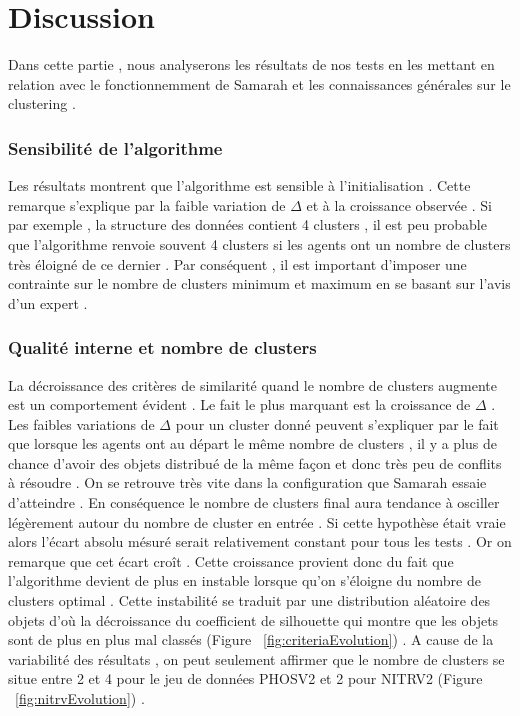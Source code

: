 \documentclass[11pt, openany]{report}
\begin{document}
\section{Discussion}
Dans cette partie ,  nous analyserons les résultats de nos tests en les mettant en relation avec le fonctionnemment de Samarah  et les connaissances générales sur le clustering .

\subsubsection{Sensibilité de l'algorithme}
\setlength{\parindent}{0in}
Les résultats montrent que l'algorithme est sensible à l'initialisation . Cette remarque s'explique par la faible variation de  $\Delta$  et à la croissance observée . Si par exemple , la structure des données contient 4 clusters , il est peu probable que l'algorithme  renvoie souvent 4 clusters si les agents ont un nombre de clusters très éloigné de ce dernier . Par conséquent , il est important d'imposer une contrainte sur le nombre de clusters minimum et maximum en se basant sur l'avis d'un expert .

\subsubsection{Qualité interne et nombre de clusters}
\setlength{\parindent}{0in}
La décroissance des critères de similarité quand le nombre de clusters augmente est un comportement évident . Le fait le plus marquant est la croissance de $\Delta$ . Les faibles variations de $\Delta$ pour un cluster donné peuvent s'expliquer par le fait que lorsque les agents ont au départ le même nombre de clusters ,  il y a plus de chance d'avoir des objets distribué de la même façon  et donc très peu de conflits à résoudre . On se retrouve très vite dans la configuration que Samarah essaie d'atteindre . En conséquence le nombre de clusters final aura tendance à osciller légèrement autour du nombre de cluster en entrée . Si cette hypothèse était vraie alors l'écart absolu mésuré serait relativement constant pour tous les tests . Or on remarque  que cet écart croît . Cette croissance provient donc du fait que l'algorithme devient de plus en instable lorsque qu'on s'éloigne du nombre de clusters optimal . Cette instabilité se traduit par une distribution aléatoire des objets d'où la décroissance du coefficient de silhouette qui montre que les objets sont de plus en plus mal classés (Figure ~\ref{fig:criteriaEvolution}) . 
\newline
\newline
A cause de la variabilité des résultats , on peut seulement affirmer que le nombre de clusters se situe entre  2 et 4 pour le jeu de données PHOSV2 et 2 pour NITRV2 (Figure ~\ref{fig:nitrvEvolution}) .
\end{document}

